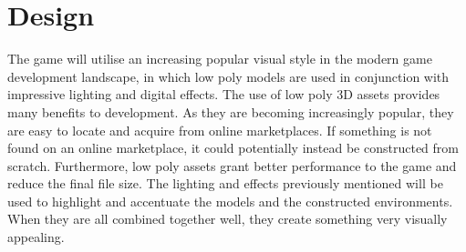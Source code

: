 \documentclass[11pt]{article}
\begin{document}
\section{Design}
The game will utilise an increasing popular visual style in the modern game development landscape, in which low poly models are used in conjunction with impressive lighting and digital effects. 
The use of low poly 3D assets provides many benefits to development. As they are becoming increasingly popular, they are easy to locate and acquire from online marketplaces. If something is not found on an online marketplace, it could potentially instead be constructed from scratch. Furthermore, low poly assets grant better performance to the game and reduce the final file size.
The lighting and effects previously mentioned will be used to highlight and accentuate the models and the constructed environments. When they are all combined together well, they create something very visually appealing. \\
\end{document}
